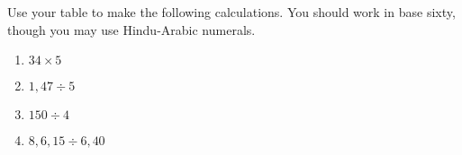 \documentclass[nooutcomes]{ximera}
\begin{document}
%

\begin{problem}
Use your table to make the following calculations.  You should work in base sixty, though you may use Hindu-Arabic numerals.
\begin{enumerate}
    \item $34 \times 5$
    \item $1,47 \div 5$
    \item $150 \div 4$
    \item $8,6,15 \div 6,40$
\end{enumerate}
\end{problem}
\end{document}
